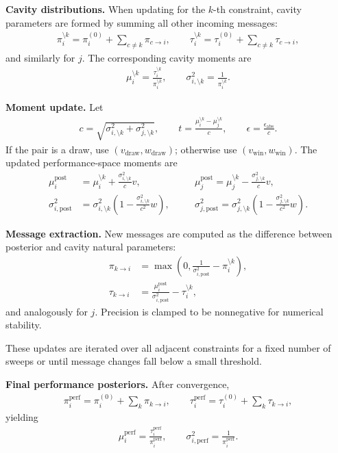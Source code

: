 \documentclass{article}
\theoremstyle{plain}
\theoremstyle{definition}
\theoremstyle{remark}
\begin{document}
\textbf{Cavity distributions.}  
When updating for the $k$-th constraint, cavity parameters are formed by summing all other incoming messages:
\begin{align*}
\pi_i^{\setminus k}=\pi_i^{(0)}+\sum_{c\neq k}\pi_{c\to i}, \qquad
\tau_i^{\setminus k}=\tau_i^{(0)}+\sum_{c\neq k}\tau_{c\to i},
\end{align*}
and similarly for $j$. The corresponding cavity moments are
\begin{align*}
\mu_i^{\setminus k}=\frac{\tau_i^{\setminus k}}{\pi_i^{\setminus k}}, \qquad
\sigma_{i,\setminus k}^2=\frac{1}{\pi_i^{\setminus k}} .
\end{align*}

\textbf{Moment update.}  
Let
\begin{align*}
c=\sqrt{\sigma_{i,\setminus k}^2+\sigma_{j,\setminus k}^2}, \qquad
t=\frac{\mu_i^{\setminus k}-\mu_j^{\setminus k}}{c}, \qquad
\epsilon=\frac{\epsilon_{\mathrm{abs}}}{c}.
\end{align*}
If the pair is a draw, use $(v_{\text{draw}},w_{\text{draw}})$; otherwise use $(v_{\text{win}},w_{\text{win}})$. The updated performance-space moments are
\begin{align*}
\mu_i^{\text{post}} &= \mu_i^{\setminus k}+\frac{\sigma_{i,\setminus k}^2}{c}v, &&\quad
\mu_j^{\text{post}} = \mu_j^{\setminus k}-\frac{\sigma_{j,\setminus k}^2}{c}v, \\
\sigma_{i,\text{post}}^2 &= \sigma_{i,\setminus k}^2\!\left(1-\frac{\sigma_{i,\setminus k}^2}{c^2}w\right), &&\quad
\sigma_{j,\text{post}}^2 = \sigma_{j,\setminus k}^2\!\left(1-\frac{\sigma_{j,\setminus k}^2}{c^2}w\right).
\end{align*}

\textbf{Message extraction.}  
New messages are computed as the difference between posterior and cavity natural parameters:
\begin{align*}
\pi_{k\to i} &= \max\!\left(0,\frac{1}{\sigma_{i,\text{post}}^2}-\pi_i^{\setminus k}\right), \\
\tau_{k\to i} &= \frac{\mu_i^{\text{post}}}{\sigma_{i,\text{post}}^2}-\tau_i^{\setminus k},
\end{align*}
and analogously for $j$. Precision is clamped to be nonnegative for numerical stability.

These updates are iterated over all adjacent constraints for a fixed number of sweeps or until message changes fall below a small threshold.

\textbf{Final performance posteriors.}  
After convergence,
\begin{align*}
\pi_i^{\text{perf}}=\pi_i^{(0)}+\sum_k \pi_{k\to i}, \qquad
\tau_i^{\text{perf}}=\tau_i^{(0)}+\sum_k \tau_{k\to i},
\end{align*}
yielding
\begin{align*}
\mu_i^{\text{perf}}=\frac{\tau_i^{\text{perf}}}{\pi_i^{\text{perf}}}, \qquad
\sigma_{i,\text{perf}}^2=\frac{1}{\pi_i^{\text{perf}}}.
\end{align*}
\end{document}
